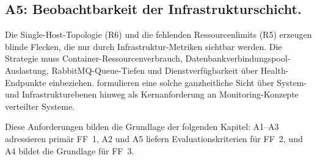 \subsection{A5: Beobachtbarkeit der Infrastrukturschicht.}
Die Single-Host-Topologie (R6) und die fehlenden Ressourcenlimits (R5) erzeugen blinde Flecken, die nur durch Infrastruktur-Metriken sichtbar werden. Die Strategie muss Container-Ressourcenverbrauch, Datenbankverbindungspool-Auslastung, RabbitMQ-Queue-Tiefen und Dienstverfügbarkeit über Health-Endpunkte einbeziehen. \textcite[S.~10]{Niedermaier2019onObservability} formulieren eine solche ganzheitliche Sicht über System- und Infrastrukturebenen hinweg als Kernanforderung an Monitoring-Konzepte verteilter Systeme.

Diese Anforderungen bilden die Grundlage der folgenden Kapitel: A1--A3 adressieren primär FF~1, A2 und A5 liefern Evaluationskriterien für FF~2, und A4 bildet die Grundlage für FF~3.